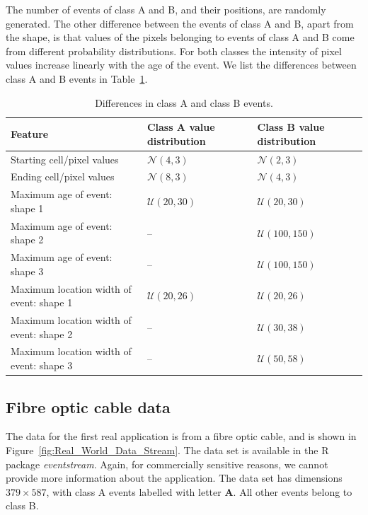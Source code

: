 \documentclass[a4paper,11pt]{article}
\begin{document}
The number of events of class A and B, and their positions, are randomly generated. The other difference between the events of class A and B, apart from the shape, is that values of the pixels belonging to events of class A and B come from different probability distributions. For both classes the intensity of pixel values increase linearly with the age of the event. We list the differences between class A and B events in Table~\ref{tab:DiffClassAandB}.

\begin{table}[!ht]
	\centering
	\begin{tabular}{lll}
		\toprule
		Feature                                  & Class A value distribution & Class B value distribution \\
		\midrule
		Starting cell/pixel values               & $\mathcal{N}(4,3)$         & $\mathcal{N}(2, 3)$        \\
		Ending cell/pixel values                 & $\mathcal{N}(8,3)$         & $\mathcal{N}(4, 3)$        \\
		Maximum age of event: shape 1            & $\mathcal{U}(20,30)$       & $\mathcal{U}(20,30)$       \\
		Maximum age of event: shape 2            & --                         & $\mathcal{U}(100,150)$     \\
		Maximum age of event: shape 3            & --                         & $\mathcal{U}(100,150)$     \\
		Maximum location width of event: shape 1 & $\mathcal{U}(20,26)$       & $\mathcal{U}(20,26)$       \\
		Maximum location width of event: shape 2 & --                         & $\mathcal{U}(30,38)$       \\
		Maximum location width of event: shape 3 & --                         & $\mathcal{U}(50,58)$       \\
		\bottomrule
	\end{tabular}
	\caption{Differences in class A and class B events.}
  \label{tab:DiffClassAandB}
\end{table}

\subsection{Fibre optic cable data}\label{sec:FibreOpticExperiment}

The data for the first real application is from a fibre optic cable, and is shown in Figure~\ref{fig:Real_World_Data_Stream}. The data set is available in the R package \textit{eventstream}. Again, for commercially sensitive reasons, we cannot provide more information about the application. The data set has dimensions $379 \times 587$, with class A events labelled with letter \textbf{A}. All other events belong to class B.
\end{document}
